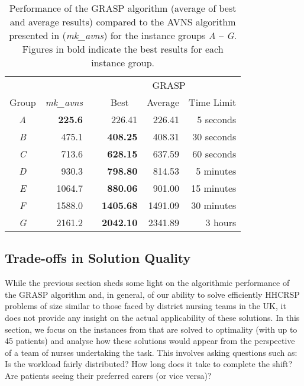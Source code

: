 \documentclass[a4paper,11pt,authoryear]{elsarticle}
\begin{document}
\begin{table}[h]
	\centering
	\caption{Performance of the GRASP algorithm (average of best and average results) compared to the AVNS algorithm presented in \citet{mankowska2014} (\emph{mk\_avns}) for the instance groups \emph{A} -- \emph{G}. Figures in bold indicate the best results for each instance group.}
	\begin{tabular}{crcrrr}
		\toprule
		        &      & \phantom{a} &   \multicolumn{3}{c}{GRASP} \\
		\cmidrule{4-6}
		Group   &   \emph{mk\_avns}    & &   \multicolumn{1}{c}{Best}        &   \multicolumn{1}{c}{Average}         &   \multicolumn{1}{c}{Time Limit}\\
		\midrule
		\emph{A}    &   \textbf{225.6}  &&  226.41  &   226.41      &   5 seconds\\
		\emph{B}    &   475.1   &&   \textbf{408.25} &   408.31      &   30 seconds\\
		\emph{C}    &   713.6   &&   \textbf{628.15} &   637.59      &   60 seconds\\
		\emph{D}    &   930.3   &&   \textbf{798.80}  &   814.53      &   5 minutes\\
		\emph{E}    &   1064.7  &&   \textbf{880.06} &   901.00       &   15 minutes\\
		\emph{F}    &   1588.0    &&   \textbf{1405.68}&   1491.09     &   30 minutes\\
		\emph{G}    &   2161.2  &&   \textbf{2042.10} &   2341.89     &   3 hours\\
		\bottomrule
	\end{tabular}
	\label{table:grouptablemkavgbest}
\end{table}



\subsection{Trade-offs in Solution Quality}
\label{sub:exploringobjfunction}
\noindent While the previous section sheds some light on the algorithmic performance of the GRASP algorithm and, in general, of our ability to solve efficiently HHCRSP problems of size similar to those faced by district nursing teams in the UK, it does not provide any insight on the actual applicability of these solutions. In this section, we focus on the instances from \cite{aithaddadene2016} that are solved to optimality (with up to 45 patients) and analyse how these solutions would appear from the perspective of a team of nurses undertaking the task. This involves asking questions such as: Is the workload fairly distributed? How long does it take to complete the shift? Are patients seeing their preferred carers (or vice versa)?
\end{document}
